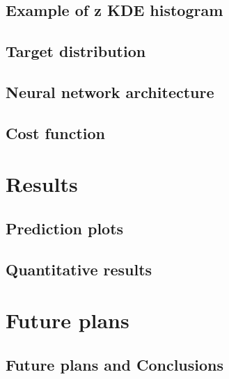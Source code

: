 \documentclass[aspectratio=169, 10pt]{beamer}
\begin{document}
\subsection{Example of z KDE histogram}


\subsection{Target distribution}


\subsection{Neural network architecture}


\subsection{Cost function}



\section{Results}

\subsection{Prediction plots}


\subsection{Quantitative results}



\section{Future plans}

\subsection{Future plans and Conclusions}

\end{document}
